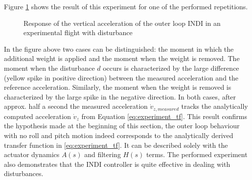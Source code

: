 \documentclass[11pt, a4paper, twoside]{report}
\begin{document}
Figure \ref{fig:experiment_plot} shows the result of this experiment for one of the performed repetitions.

\begin{figure}[H]
	\centering 
	\captionsetup{justification=centering, singlelinecheck=off, font=bf, belowskip=-0.5cm}
	\caption[Response of the vertical acceleration of the outer loop \acrshort{INDI}]{Response of the vertical acceleration of the outer loop \acrshort{INDI} in an experimental flight with disturbance}
	\label{fig:experiment_plot}
\end{figure}

In the figure above two cases can be distinguished: the moment in which the additional weight is applied and the moment when the weight is removed. The moment when the disturbance $d$ occurs is characterized by the large difference (yellow spike in positive direction) between the measured acceleration and the reference acceleration. Similarly, the moment when the weight is removed is characterized by the large spike in the negative direction. In both cases, after approx. half a second the measured acceleration $\dot{v}_{z,measured}$ tracks the analytically computed acceleration $\dot{v}_{z}$ from Equation \ref{eq:experiment_tf}. This result confirms the hypothesis made at the beginning of this section, the outer loop behaviour with no roll and pitch motion indeed corresponds to the analytically derived transfer function in \ref{eq:experiment_tf}. It can be described solely with the actuator dynamics $A(s)$ and filtering $H(s)$ terms. The performed experiment also demonstrates that the \acrshort{INDI} controller is quite effective in dealing with disturbances.  
\end{document}

